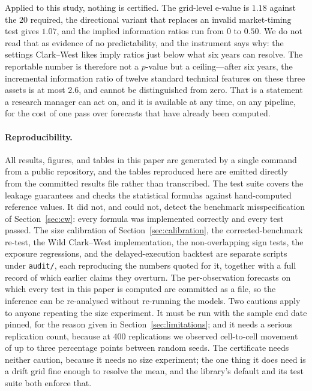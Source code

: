 \documentclass{article}
\theoremstyle{plain}
\theoremstyle{definition}
\begin{document}
Applied to this study, nothing is certified. The grid-level e-value is $1.18$ against the
$20$ required, the directional variant that replaces an invalid market-timing test gives
$1.07$, and the implied information ratios run from $0$ to $0.50$. We do not read that as
evidence of no predictability, and the instrument says why: the settings Clark--West likes
imply ratios just below what six years can resolve. The reportable number is therefore not a
$p$-value but a ceiling---after six years, the incremental information ratio of twelve
standard technical features on these three assets is at most $2.6$, and cannot be
distinguished from zero. That is a statement a research manager can act on, and it is
available at any time, on any pipeline, for the cost of one pass over forecasts that have
already been computed.

\paragraph{Reproducibility.} All results, figures, and tables in this paper are
generated by a single command from a public repository, and the tables reproduced
here are emitted directly from the committed results file rather than transcribed.
The test suite covers the leakage guarantees and checks the statistical formulas
against hand-computed reference values. It did not, and could not, detect the
benchmark misspecification of Section~\ref{sec:cw}: every formula was implemented
correctly and every test passed. The size calibration of
Section~\ref{sec:calibration}, the corrected-benchmark re-test, the Wild Clark--West
implementation, the non-overlapping sign tests, the exposure regressions, and the
delayed-execution backtest are separate scripts under \texttt{audit/}, each
reproducing the numbers quoted for it, together with a full record of which earlier
claims they overturn. The per-observation forecasts on which every test in this
paper is computed are committed as a file, so the inference can be re-analysed
without re-running the models. Two cautions apply to anyone repeating the size
experiment. It must be run with the sample end date pinned, for the reason given in
Section~\ref{sec:limitations}; and it needs a serious replication count, because at
400 replications we observed cell-to-cell movement of up to three percentage points
between random seeds. The certificate needs neither caution, because it needs no size
experiment; the one thing it does need is a drift grid fine enough to resolve the mean, and
the library's default and its test suite both enforce that.
\end{document}

